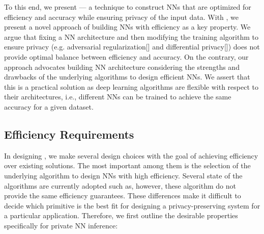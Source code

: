 To this end, we present \method --- a technique to construct NNs that are optimized for efficiency and accuracy while ensuring privacy of the input data.
With \method, we present a novel approach of building NNs with efficiency as a key property.
We argue that fixing a NN architecture and then modifying the training algorithm to ensure privacy (e.g. adversarial regularization[] and differential privacy[]) does not provide optimal balance between efficiency and accuracy.
On the contrary, our approach advocates building NN architecture considering the strengths and drawbacks of the underlying algorithms to design efficient NNs.
We assert that this is a practical solution as deep learning algorithms are flexible with respect to their architectures, i.e., different NNs can be trained to achieve the same accuracy for a given dataset.


\subsection{Efficiency Requirements}

In designing \method, we make several design choices with the goal of achieving efficiency over existing solutions.
The most important among them is the selection of the underlying algorithm to design NNs with high efficiency.
Several state of the algorithms are currently adopted such as, however, these algorithm do not provide the same efficiency guarantees.
These differences make it difficult to decide which primitive is the best fit for designing a privacy-preserving system for a particular application.
Therefore, we first outline the desirable properties specifically for private NN inference:

